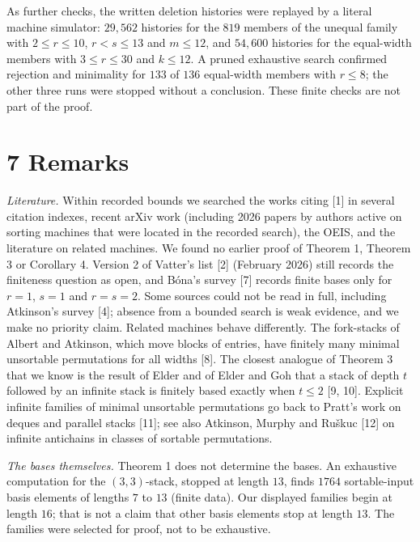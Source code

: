 \documentclass[11pt,letterpaper]{article}
\begin{document}
As further checks, the written deletion histories were replayed by a
literal machine simulator: \(29{,}562\) histories for the \(819\)
members of the unequal family with \(2\le r\le10\), \(r<s\le13\) and
\(m\le12\), and \(54{,}600\) histories for the equal-width members with
\(3\le r\le30\) and \(k\le12\). A pruned exhaustive search confirmed
rejection and minimality for \(133\) of \(136\) equal-width members with
\(r\le8\); the other three runs were stopped without a conclusion. These
finite checks are not part of the proof.

\section{7 Remarks}\label{remarks}

\emph{Literature.} Within recorded bounds we searched the works citing
{[}1{]} in several citation indexes, recent arXiv work (including 2026
papers by authors active on sorting machines that were located in the
recorded search), the OEIS, and the literature on related machines. We
found no earlier proof of Theorem 1, Theorem 3 or Corollary 4. Version 2
of Vatter's list {[}2{]} (February 2026) still records the finiteness
question as open, and Bóna's survey {[}7{]} records finite bases only
for \(r=1\), \(s=1\) and \(r=s=2\). Some sources could not be read in
full, including Atkinson's survey {[}4{]}; absence from a bounded search
is weak evidence, and we make no priority claim. Related machines behave
differently. The fork-stacks of Albert and Atkinson, which move blocks
of entries, have finitely many minimal unsortable permutations for all
widths {[}8{]}. The closest analogue of Theorem 3 that we know is the
result of Elder and of Elder and Goh that a stack of depth \(t\)
followed by an infinite stack is finitely based exactly when \(t\le2\)
{[}9, 10{]}. Explicit infinite families of minimal unsortable
permutations go back to Pratt's work on deques and parallel stacks
{[}11{]}; see also Atkinson, Murphy and Ruškuc {[}12{]} on infinite
antichains in classes of sortable permutations.

\emph{The bases themselves.} Theorem 1 does not determine the bases. An
exhaustive computation for the \((3,3)\)-stack, stopped at length
\(13\), finds \(1764\) sortable-input basis elements of lengths \(7\) to
\(13\) (finite data). Our displayed families begin at length \(16\);
that is not a claim that other basis elements stop at length \(13\). The
families were selected for proof, not to be exhaustive.
\end{document}

